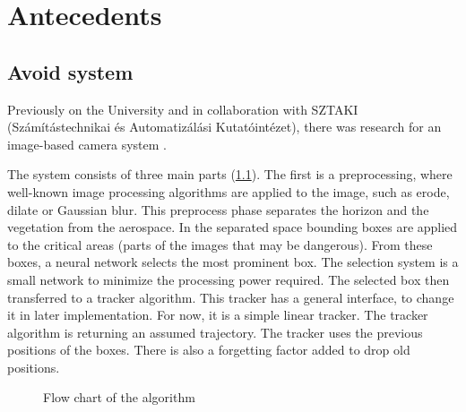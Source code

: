 \chapter{Antecedents} \label{ch:ant} %

\section{Avoid system} %
Previously on the University and in collaboration with SZTAKI (Számítástechnikai és Automatizálási Kutatóintézet), there was research for an image-based camera system  \cite{Zarandy2016}  \cite{Bauer2019} \cite{Zsedrovits2016a} \cite{Fuller2014HardwareDA}.

The system consists of three main parts (\cref{fig:Algorithm}).
The first is a preprocessing, where well-known image processing algorithms are applied to the image, such as erode, dilate or Gaussian blur.
This preprocess phase separates the horizon and the vegetation from the aerospace.
In the separated space bounding boxes are applied to the critical areas (parts of the images that may be dangerous).
From these boxes, a neural network selects the most prominent box.
The selection system is a small network to minimize the processing power required.
The selected box then transferred to a tracker algorithm.
This tracker has a general interface, to change it in later implementation.
For now, it is a simple linear tracker.
The tracker algorithm is returning an assumed trajectory.
The tracker uses the previous positions of the boxes. 
There is also a forgetting factor added to drop old positions.

\begin{figure}
    \centering
{}
\caption{Flow chart of the algorithm}
\label{fig:Algorithm}
\end{figure}


